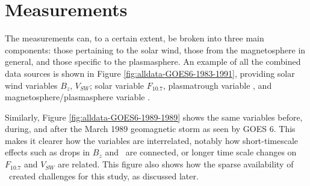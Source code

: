 \chapter[Measurements]{Measurements}


The measurements can, to a certain extent, be broken into three main components: those pertaining to the solar wind, those from the magnetosphere in general, and those specific to the plasmasphere. An example of all the combined data sources is shown in Figure \ref{fig:alldata-GOES6-1983-1991}, providing solar wind variables $B_z$, $V_{SW}$; solar variable $F_{10.7}$, plasmatrough variable \req, and magnetosphere/plasmasphere variable \dst.

Similarly, Figure \ref{fig:alldata-GOES6-1989-1989} shows the same variables before, during, and after the March 1989 geomagnetic storm as seen by GOES 6. This makes it clearer how the variables are interrelated, notably how short-timescale effects such as drops in $B_z$ and \dst\ are connected, or longer time scale changes on $F_{10.7}$ and $V_{SW}$ are related. This figure also shows how the sparse availability of \req\ created challenges for this study, as discussed later.

